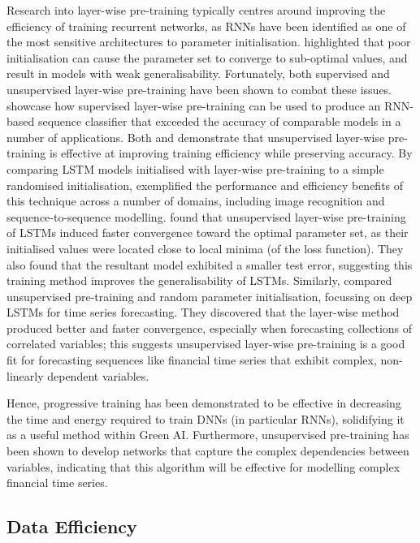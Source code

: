 \documentclass[a4paper, 11pt]{report}
\begin{document}
    Research into layer-wise pre-training typically centres around improving the efficiency of training recurrent networks, as RNNs have been identified as one of the most sensitive architectures to parameter initialisation. \citet{xu-2018} highlighted that poor initialisation can cause the parameter set to converge to sub-optimal values, and \citet{ienco-2019} result in models with weak generalisability. Fortunately, both supervised and unsupervised layer-wise pre-training have been shown to combat these issues. \citet{ienco-2019} showcase how supervised layer-wise pre-training can be used to produce an RNN-based sequence classifier that exceeded the accuracy of comparable models in a number of applications. Both \citet{xu-2018} and \citet{sagheer-2019} demonstrate that unsupervised layer-wise pre-training is effective at improving training efficiency while preserving accuracy. By comparing LSTM models initialised with layer-wise pre-training to a simple randomised initialisation, \citet{xu-2018} exemplified the performance and efficiency benefits of this technique across a number of domains, including image recognition and sequence-to-sequence modelling. \citet{xu-2018} found that unsupervised layer-wise pre-training of LSTMs induced faster convergence toward the optimal parameter set, as their initialised values were located close to local minima (of the loss function). They also found that the resultant model exhibited a smaller test error, suggesting this training method improves the generalisability of LSTMs. Similarly, \citet{sagheer-2019} compared unsupervised pre-training and random parameter initialisation, focussing on deep LSTMs for time series forecasting. They discovered that the layer-wise method produced better and faster convergence, especially when forecasting collections of correlated variables; this suggests unsupervised layer-wise pre-training is a good fit for forecasting sequences like financial time series that exhibit complex, non-linearly dependent variables.

    Hence, progressive training has been demonstrated to be effective in decreasing the time and energy required to train DNNs (in particular RNNs), solidifying it as a useful method within Green AI. Furthermore, unsupervised pre-training has been shown to develop networks that capture the complex dependencies between variables, indicating that this algorithm will be effective for modelling complex financial time series.


    \subsection{Data Efficiency}
\end{document}
